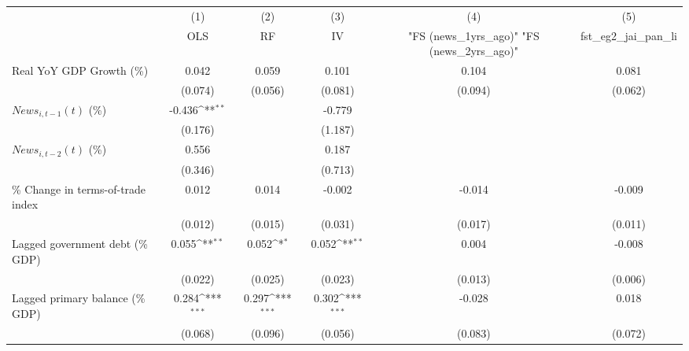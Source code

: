 {
\def\sym#1{\ifmmode^{#1}\else\(^{#1}\)\fi}
\begin{tabular}{l*{5}{c}}
\toprule
                    &\multicolumn{1}{c}{(1)}&\multicolumn{1}{c}{(2)}&\multicolumn{1}{c}{(3)}&\multicolumn{1}{c}{(4)}&\multicolumn{1}{c}{(5)}\\
                    &\multicolumn{1}{c}{OLS}&\multicolumn{1}{c}{RF}&\multicolumn{1}{c}{IV}&\multicolumn{1}{c}{ "FS (news_1yrs_ago)"  "FS (news_2yrs_ago)" }&\multicolumn{1}{c}{fst_eg2_jai_pan_li}\\
\midrule
Real YoY GDP Growth (\%)&       0.042         &       0.059         &       0.101         &       0.104         &       0.081         \\
                    &     (0.074)         &     (0.056)         &     (0.081)         &     (0.094)         &     (0.062)         \\
\addlinespace
$ News_{i,t-1}(t)$ (\%)&      -0.436\sym{**} &                     &      -0.779         &                     &                     \\
                    &     (0.176)         &                     &     (1.187)         &                     &                     \\
\addlinespace
$ News_{i,t-2}(t)$ (\%)&       0.556         &                     &       0.187         &                     &                     \\
                    &     (0.346)         &                     &     (0.713)         &                     &                     \\
\addlinespace
\% Change in terms-of-trade index&       0.012         &       0.014         &      -0.002         &      -0.014         &      -0.009         \\
                    &     (0.012)         &     (0.015)         &     (0.031)         &     (0.017)         &     (0.011)         \\
\addlinespace
Lagged government debt (\% GDP)&       0.055\sym{**} &       0.052\sym{*}  &       0.052\sym{**} &       0.004         &      -0.008         \\
                    &     (0.022)         &     (0.025)         &     (0.023)         &     (0.013)         &     (0.006)         \\
\addlinespace
Lagged primary balance (\% GDP)&       0.284\sym{***}&       0.297\sym{***}&       0.302\sym{***}&      -0.028         &       0.018         \\
                    &     (0.068)         &     (0.096)         &     (0.056)         &     (0.083)         &     (0.072)         \\

\end{tabular}}
